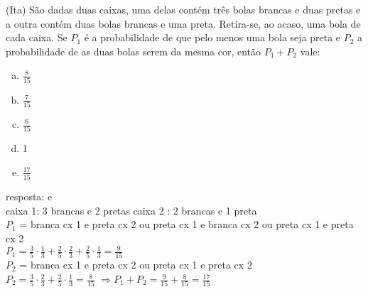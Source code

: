 \begin{ex}
  (Ita) São dadas duas caixas, uma delas contém três bolas brancas e duas pretas e a outra contém duas bolas brancas e uma preta. Retira-se, ao acaso, uma bola de cada caixa. Se $P_1$ é a probabilidade de que pelo menos uma bola seja preta e $P_2$ a probabilidade de as duas bolas serem da mesma cor, então $P_1 +P_2$ vale: 
    \begin{enumerate} [(a)]
        \item $\frac{8}{15}$
        \item $\frac{7}{15}$
        \item $\frac{6}{15}$
        \item 1
        \item $\frac{17}{15}$
    \end{enumerate}
      \begin{sol}
       resposta: e \\
       caixa 1: 3 brancas e 2 pretas \hspace{0,5cm} caixa 2 : 2 brancas e 1 preta \\
    $P_1$ = branca cx 1 e preta cx 2 ou preta cx 1 e branca cx 2 ou preta cx 1 e preta cx 2\\
    $P_1= \frac{3}{5}\cdot\frac{1}{3}+\frac{2}{5}\cdot\frac{2}{3}+\frac{2}{5}\cdot\frac{1}{3}=\frac{9}{15}$\\
    $P_2$ = branca cx 1 e preta cx 2 ou preta cx 1 e preta cx 2 \\
    $P_2=\frac{3}{5}\cdot\frac{2}{3}+\frac{2}{5}\cdot\frac{1}{3}=\frac{8}{15}$ \hspace{0,6cm}
    $\Longrightarrow P_1+P_2= \frac{9}{15}+\frac{8}{15}=\frac{17}{15}$
    
      \end{sol}
 \end{ex}
